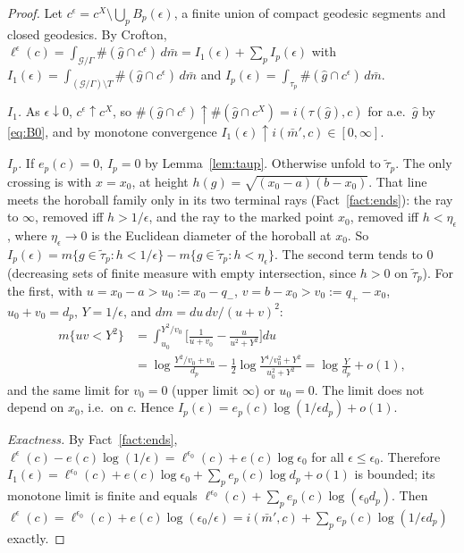 \documentclass[aps,prd,onecolumn,superscriptaddress,nofootinbib,amsmath,amssymb,11pt]{revtex4-2}
\theoremstyle{definition}
\newcommand{\eps}{\epsilon}
\newcommand{\Gq}{\mathcal{G}/\Gamma}
\newcommand{\mbar}{\bar m}
\begin{document}
\begin{proof}
Let $c^\eps=c^X\setminus\bigcup_pB_p(\eps)$, a finite union of compact geodesic segments and closed geodesics. By
Crofton, $\ell^\eps(c)=\int_{\Gq}\#(\hat g\cap c^\eps)\,d\mbar=I_1(\eps)+\sum_pI_p(\eps)$ with
$I_1(\eps)=\int_{(\Gq)\setminus T}\#(\hat g\cap c^\eps)\,d\mbar$ and $I_p(\eps)=\int_{\tau_p}\#(\hat g\cap c^\eps)\,d\mbar$.

\emph{$I_1$.} As $\eps\downarrow0$, $c^\eps\uparrow c^X$, so $\#(\hat g\cap c^\eps)\uparrow\#(\hat g\cap c^X)=i(\tau(\hat g),c)$
for a.e.\ $\hat g$ by \eqref{eq:B0}, and by monotone convergence $I_1(\eps)\uparrow i(\mbar',c)\in[0,\infty]$.

\emph{$I_p$.} If $e_p(c)=0$, $I_p=0$ by Lemma~\ref{lem:taup}. Otherwise unfold to $\tilde\tau_p$. The only crossing is
with $x=x_0$, at height $h(g)=\sqrt{(x_0-a)(b-x_0)}$. That line meets the horoball family only in its two terminal
rays (Fact~\ref{fact:ends}): the ray to $\infty$, removed iff $h>1/\eps$, and the ray to the marked point $x_0$,
removed iff $h<\eta_\eps$, where $\eta_\eps\to0$ is the Euclidean diameter of the horoball at $x_0$. So
$I_p(\eps)=m\{g\in\tilde\tau_p:h<1/\eps\}-m\{g\in\tilde\tau_p:h<\eta_\eps\}$. The second term tends to $0$
(decreasing sets of finite measure with empty intersection, since $h>0$ on $\tilde\tau_p$). For the first, with
$u=x_0-a>u_0:=x_0-q_-$, $v=b-x_0>v_0:=q_+-x_0$, $u_0+v_0=d_p$, $Y=1/\eps$, and $dm=du\,dv/(u+v)^2$:
\[
\begin{aligned}
m\{uv<Y^2\}&=\int_{u_0}^{Y^2/v_0}\Big[\frac{1}{u+v_0}-\frac{u}{u^2+Y^2}\Big]du\\
&=\log\frac{Y^2/v_0+v_0}{d_p}-\frac12\log\frac{Y^4/v_0^2+Y^2}{u_0^2+Y^2}=\log\frac{Y}{d_p}+o(1),
\end{aligned}
\]
and the same limit for $v_0=0$ (upper limit $\infty$) or $u_0=0$. The limit does not depend on $x_0$, i.e.\ on $c$.
Hence $I_p(\eps)=e_p(c)\log(1/\eps d_p)+o(1)$.

\emph{Exactness.} By Fact~\ref{fact:ends}, $\ell^\eps(c)-e(c)\log(1/\eps)=\ell^{\eps_0}(c)+e(c)\log\eps_0$ for all
$\eps\le\eps_0$. Therefore $I_1(\eps)=\ell^{\eps_0}(c)+e(c)\log\eps_0+\sum_pe_p(c)\log d_p+o(1)$ is bounded; its
monotone limit is finite and equals $\ell^{\eps_0}(c)+\sum_pe_p(c)\log(\eps_0d_p)$. Then
$\ell^\eps(c)=\ell^{\eps_0}(c)+e(c)\log(\eps_0/\eps)=i(\mbar',c)+\sum_pe_p(c)\log(1/\eps d_p)$ exactly.
\end{proof}
\end{document}
